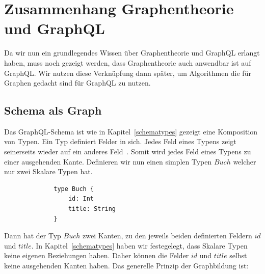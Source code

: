 \newpage
\section{Zusammenhang Graphentheorie und GraphQL}
\label{graphtheorieQL}

Da wir nun ein grundlegendes Wissen über Graphentheorie und GraphQL erlangt haben, muss noch gezeigt werden,
dass Graphentheorie auch anwendbar ist auf GraphQL.
Wir nutzen diese Verknüpfung dann später, um Algorithmen die für Graphen gedacht sind für GraphQL zu nutzen.

\subsection{Schema als Graph}

Das GraphQL-Schema ist wie in Kapitel~\ref{schematypes} gezeigt eine Komposition von Typen.
Ein Typ definiert Felder in sich.
Jedes Feld eines Typens zeigt seinerseits wieder auf ein anderes Feld~\cite[vgl. Modelling with GraphQL]{graphqlgraphtheory}.
Somit wird jedes Feld eines Typens zu einer ausgehenden Kante.
Definieren wir nun einen simplen Typen $Buch$ welcher nur zwei Skalare Typen hat.

\begin{figure}[ht]
    \centering
    \begin{minipage}[b]{0.4\textwidth}
        \begin{verbatim}
        type Buch {
            id: Int
            title: String
        }
        \end{verbatim}
    \end{minipage}
    \hfill
    \begin{minipage}[b]{0.4\textwidth}
    \end{minipage}
\end{figure}

Dann hat der Typ $Buch$ zwei Kanten, zu den jeweils beiden definierten Feldern $id$ und $title$.
In Kapitel~\ref{schematypes} haben wir festegelegt, dass Skalare Typen keine eigenen Beziehungen haben.
Daher können die Felder $id$ und $title$ selbst keine ausgehenden Kanten haben.
Das generelle Prinzip der Graphbildung ist:

